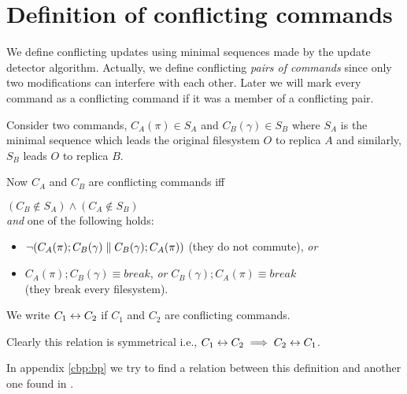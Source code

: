 \section{Definition of conflicting commands}
\label{cbp:defconfl}

We define conflicting updates using minimal sequences made by the
update detector algorithm. Actually, we define conflicting \emph{pairs
of commands} since only two modifications can interfere with each other.
Later we will mark every command as a conflicting command if
it was a member of a conflicting pair. 

Consider two commands, \(C_A(\pi)\in S_A\) and \(C_B(\gamma)\in S_B\) 
where \(S_A\) is the minimal sequence which
leads the original filesystem \(O\) to replica \(A\) and similarly,
\(S_B\) leads \(O\) to replica \(B\).

Now \(C_A\) and \(C_B\) are conflicting commands iff
\begin{center}
\((C_B\not\in S_A)\wedge(C_A\not\in S_B)\)\\\medskip
\emph{and} one of the following holds:\\\medskip
\begin{minipage}{12cm}
\begin{itemize}
\item \(\neg(C_A(\pi); C_B(\gamma) \parallel C_B(\gamma); C_A(\pi))\)
 (they do not commute), \emph{or}
\item \(C_A(\pi); C_B(\gamma) \equiv break\), \emph{or}
\(C_B(\gamma); C_A(\pi) \equiv break\)\\(they break every
filesystem).
\end{itemize}\end{minipage}
\end{center}

We write \(C_1\leftrightarrow C_2\) if \(C_1\) and \(C_2\) are conflicting
commands.
\begin{notrsi}
Clearly this relation is symmetrical i.e.,
\(C_1\leftrightarrow C_2\implies C_2\leftrightarrow C_1\).
\end{notrsi}

In appendix \ref{cbp:bp} we try to find a relation between this
definition and another one found in \BP.

